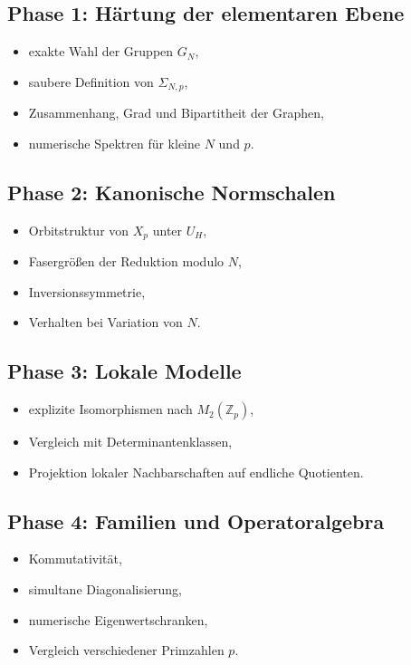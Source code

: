 \documentclass[12pt,a4paper]{article}
\theoremstyle{plain}
\theoremstyle{definition}
\theoremstyle{remark}
\newcommand{\Z}{\mathbb{Z}}
\begin{document}
	\subsection*{Phase 1: Härtung der elementaren Ebene}
	\begin{itemize}
		\item exakte Wahl der Gruppen $G_N$,
		\item saubere Definition von $\Sigma_{N,p}$,
		\item Zusammenhang, Grad und Bipartitheit der Graphen,
		\item numerische Spektren für kleine $N$ und $p$.
	\end{itemize}
	
	\subsection*{Phase 2: Kanonische Normschalen}
	\begin{itemize}
		\item Orbitstruktur von $X_p$ unter $U_H$,
		\item Fasergrößen der Reduktion modulo $N$,
		\item Inversionssymmetrie,
		\item Verhalten bei Variation von $N$.
	\end{itemize}
	
	\subsection*{Phase 3: Lokale Modelle}
	\begin{itemize}
		\item explizite Isomorphismen nach $M_2(\Z_p)$,
		\item Vergleich mit Determinantenklassen,
		\item Projektion lokaler Nachbarschaften auf endliche Quotienten.
	\end{itemize}
	
	\subsection*{Phase 4: Familien und Operatoralgebra}
	\begin{itemize}
		\item Kommutativität,
		\item simultane Diagonalisierung,
		\item numerische Eigenwertschranken,
		\item Vergleich verschiedener Primzahlen $p$.
	\end{itemize}
	
\end{document}
